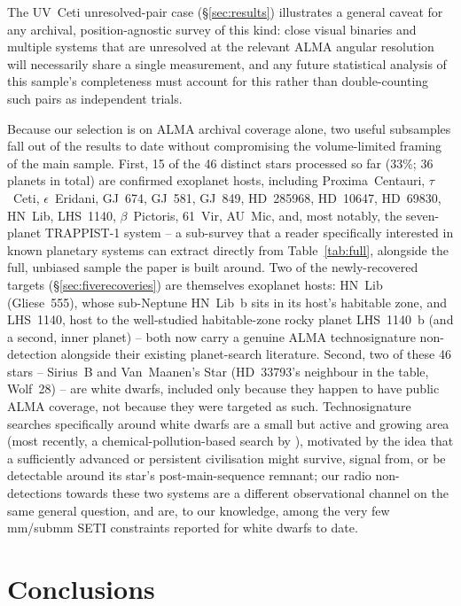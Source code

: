 \documentclass{openjournal}
\begin{document}
The UV~Ceti unresolved-pair case (\S\ref{sec:results}) illustrates a
general caveat for any archival, position-agnostic survey of this kind:
close visual binaries and multiple systems that are unresolved at the
relevant ALMA angular resolution will necessarily share a single
measurement, and any future statistical analysis of this sample's
completeness must account for this rather than double-counting such
pairs as independent trials.

Because our selection is on ALMA archival coverage alone, two useful
subsamples fall out of the results to date without compromising the
volume-limited framing of the main sample. First, 15 of the 46 distinct
stars processed so far (33\%; 36 planets in total) are confirmed
exoplanet hosts, including Proxima~Centauri, $\tau$~Ceti, $\epsilon$~Eridani,
GJ~674, GJ~581, GJ~849, HD~285968, HD~10647, HD~69830, HN~Lib, LHS~1140,
$\beta$~Pictoris, 61~Vir, AU~Mic,
and, most notably, the seven-planet TRAPPIST-1 system -- a sub-survey
that a reader specifically interested in known planetary systems can
extract directly from Table~\ref{tab:full}, alongside the full, unbiased
sample the paper is built around. Two of the newly-recovered targets
(\S\ref{sec:fiverecoveries}) are themselves exoplanet hosts: HN~Lib
(Gliese~555), whose sub-Neptune HN~Lib~b sits in its host's habitable
zone, and LHS~1140, host to the well-studied habitable-zone rocky planet
LHS~1140~b (and a second, inner planet) -- both now carry a genuine ALMA
technosignature non-detection alongside their existing planet-search
literature. Second, two of these 46 stars --
Sirius~B and Van~Maanen's Star (HD~33793's neighbour in the table,
Wolf~28) -- are white dwarfs, included only because they happen to have
public ALMA coverage, not because they were targeted as such.
Technosignature searches specifically around white dwarfs are a small
but active and growing area (most recently, a chemical-pollution-based
search by \citealt{PollutedWD2026}), motivated by the idea that a
sufficiently advanced or persistent civilisation might survive, signal
from, or be detectable around its star's post-main-sequence remnant;
our radio non-detections towards these two systems are a different
observational channel on the same general question, and are, to our
knowledge, among the very few mm/submm SETI constraints reported for
white dwarfs to date.

\section{Conclusions}
\label{sec:conclusions}
\end{document}
